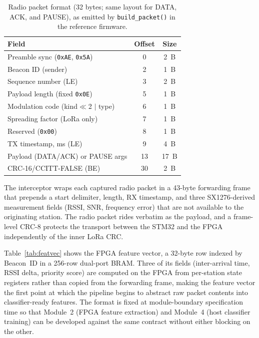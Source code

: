 \documentclass[conference]{IEEEtran}
\begin{document}
\begin{table}[t]
\centering
\caption{Radio packet format (32 bytes; same layout for DATA, ACK, and PAUSE), as emitted by \texttt{build\_packet()} in the reference firmware.}
\label{tab:beaconframe}
\begin{tabular}{l c c}
\toprule
\textbf{Field} & \textbf{Offset} & \textbf{Size} \\
\midrule
Preamble sync (\texttt{0xAE}, \texttt{0x5A}) & 0  & 2~B \\
Beacon ID (sender)              & 2  & 1~B \\
Sequence number (LE)            & 3  & 2~B \\
Payload length (fixed \texttt{0x0E})    & 5  & 1~B \\
Modulation code (kind$\ll$2 $|$ type) & 6 & 1~B \\
Spreading factor (LoRa only)    & 7  & 1~B \\
Reserved (\texttt{0x00})        & 8  & 1~B \\
TX timestamp, ms (LE)           & 9  & 4~B \\
Payload (DATA/ACK) or PAUSE args & 13 & 17~B \\
CRC-16/CCITT-FALSE (BE)         & 30 & 2~B \\
\bottomrule
\end{tabular}
\end{table}

The interceptor wraps each captured radio packet in a 43-byte forwarding frame that prepends a start delimiter, length, RX timestamp, and three SX1276-derived measurement fields (RSSI, SNR, frequency error) that are not available to the originating station. The radio packet rides verbatim as the payload, and a frame-level CRC-8 protects the transport between the STM32 and the FPGA independently of the inner LoRa CRC.

Table~\ref{tab:featvec} shows the FPGA feature vector, a 32-byte row indexed by Beacon~ID in a 256-row dual-port BRAM. Three of its fields (inter-arrival time, RSSI delta, priority score) are computed on the FPGA from per-station state registers rather than copied from the forwarding frame, making the feature vector the first point at which the pipeline begins to abstract raw packet contents into classifier-ready features. The format is fixed at module-boundary specification time so that Module~2 (FPGA feature extraction) and Module~4 (host classifier training) can be developed against the same contract without either blocking on the other.
\end{document}
